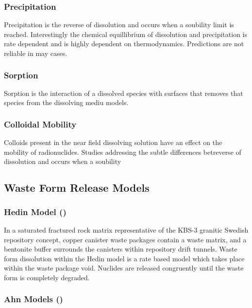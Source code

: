 \subsubsection{Precipitation}

Precipitation is the reverse of dissolution and occurs when a 
soubility limit is reached. Interestingly the chemical equillibrium of 
dissolution and precipitation is rate dependent and is highly 
dependent on thermodynamics.  Predictions are not reliable in may 
cases.

\subsubsection{Sorption}

Sorption is the interaction of a dissolved species with surfaces that 
removes that species from the dissolving mediu models.


\subsubsection{Colloidal Mobility}

Colloids present in the near field dissolving solution have an effect 
on the mobility of radionuclides. Studies addressing the subtle 
differences betreverse of dissolution and occurs when a soubility

\subsection{Waste Form Release Models}

\subsubsection{Hedin Model (\cite{hedin_integrated_2002})}

In a saturated fractured rock matrix representative of the KBS-3 
granitic Swedish repository concept, copper canister waste packages 
contain a waste matrix, and a bentonite buffer surrounds the canisters 
within repository drift tunnels. Waste form dissolution within the 
Hedin model is a rate based model which takes place within the waste 
package void. Nuclides are released congruently until the waste form 
is completely degraded. \cite{hedin_integrated_2002} 

\subsubsection{Ahn Models (\cite{ahn_environmental_2004, 
ahn_environmental_2007})}


